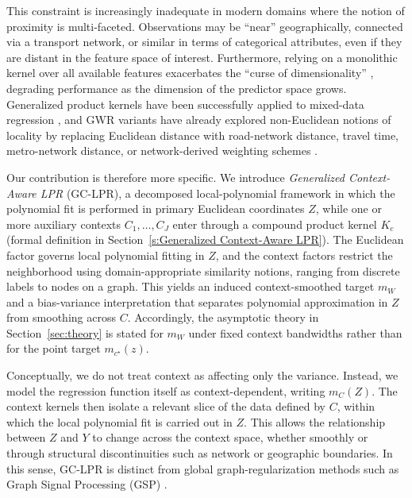 \documentclass[final,1p,times,authoryear]{elsarticle}
\begin{document}
This constraint is increasingly inadequate in modern domains where the notion of proximity is multi-faceted. Observations may be ``near'' geographically, connected via a transport network, or similar in terms of categorical attributes, even if they are distant in the feature space of interest. Furthermore, relying on a monolithic kernel over all available features exacerbates the ``curse of dimensionality'' \citep{stone1982optimal}, degrading performance as the dimension of the predictor space grows. Generalized product kernels have been successfully applied to mixed-data regression \citep{li2004nonparametric}, and GWR variants have already explored non-Euclidean notions of locality by replacing Euclidean distance with road-network distance, travel time, metro-network distance, or network-derived weighting schemes \citep{lu2011non_euclidean_gwr,lu2014non_euclidean_gwr,gao2022network_distance_gwr,he2023network_weight_gwr}. 

Our contribution is therefore more specific. We introduce \emph{Generalized Context-Aware LPR} (GC-LPR), a decomposed local-polynomial framework in which the polynomial fit is performed in primary Euclidean coordinates $Z$, while one or more auxiliary contexts $C_1,\ldots,C_J$ enter through a compound product kernel $K_c$ (formal definition in Section~\ref{s:Generalized Context-Aware LPR}). The Euclidean factor governs local polynomial fitting in $Z$, and the context factors restrict the neighborhood using domain-appropriate similarity notions, ranging from discrete labels to nodes on a graph. This yields an induced context-smoothed target $m_W$ and a bias-variance interpretation that separates polynomial approximation in $Z$ from smoothing across $C$. Accordingly, the asymptotic theory in Section~\ref{sec:theory} is stated for $m_W$ under fixed context bandwidths rather than for the point target $m_{c^\star}(z)$.

Conceptually, we do not treat context as affecting only the variance. Instead, we model the regression function itself as context-dependent, writing $m_C(Z)$. The context kernels then isolate a relevant slice of the data defined by $C$, within which the local polynomial fit is carried out in $Z$. This allows the relationship between $Z$ and $Y$ to change across the context space, whether smoothly or through structural discontinuities such as network or geographic boundaries. In this sense, GC-LPR is distinct from global graph-regularization methods such as Graph Signal Processing (GSP) \citep{shuman2013emerging}.
\end{document}
